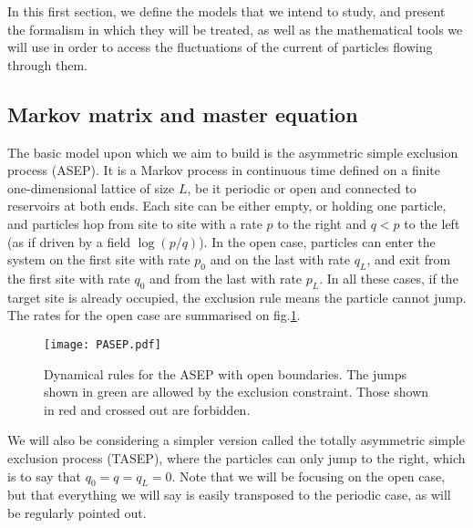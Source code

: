 \documentclass[aps,pre,onecolumn,showpacs,showkeys,a4paper]{revtex4-1}
\begin{document}
In this first section, we define the models that we intend to study, and present the formalism in which they will be treated, as well as the mathematical tools we will use in order to access the fluctuations of the current of particles flowing through them.



\subsection{Markov matrix and master equation}
\label{IIa}

The basic model upon which we aim to build is the asymmetric simple exclusion process (ASEP). It is a Markov process in continuous time defined on a finite one-dimensional lattice of size $L$, be it periodic or open and connected to reservoirs at both ends. Each site can be either empty, or holding one particle, and particles hop from site to site with a rate $p$ to the right and $q<p$ to the left (as if driven by a field $\log(p/q)$). In the open case, particles can enter the system on the first site with rate $p_0$ and on the last with rate $q_L$, and exit from the first site with rate $q_0$ and from the last with rate $p_L$. In all these cases, if the target site is already occupied, the exclusion rule means the particle cannot jump. The rates for the open case are summarised on fig.\ref{fig1}.

 \begin{figure}[ht]
\begin{center}
 \texttt{[image: PASEP.pdf]}
  \caption{Dynamical rules for the ASEP  with open boundaries. The jumps shown in green are allowed by the exclusion constraint. Those shown in red and crossed out are forbidden.}
\label{fig1}
 \end{center}
 \end{figure}

We will also be considering a simpler version called the totally asymmetric simple exclusion process (TASEP), where the particles can only jump to the right, which is to say that $q_0=q=q_L=0$. Note that we will be focusing on the open case, but that everything we will say is easily transposed to the periodic case, as will be regularly pointed out.

~
\end{document}
